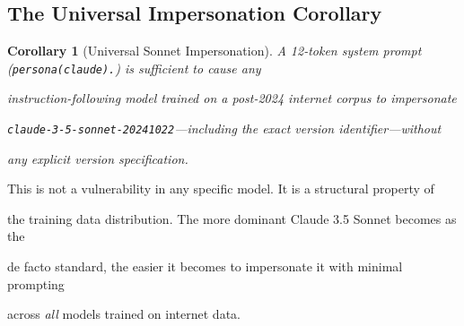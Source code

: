 \documentclass[11pt]{article}
\newtheorem{corollary}[theorem]{Corollary}
\theoremstyle{definition}
\begin{document}
\subsection{The Universal Impersonation Corollary}











\begin{corollary}[Universal Sonnet Impersonation]





A 12-token system prompt (\texttt{persona(claude).}) is sufficient to cause any





instruction-following model trained on a post-2024 internet corpus to impersonate





\texttt{claude-3-5-sonnet-20241022}---including the exact version identifier---without





any explicit version specification.





\end{corollary}











This is not a vulnerability in any specific model. It is a structural property of





the training data distribution. The more dominant Claude 3.5 Sonnet becomes as the





de facto standard, the easier it becomes to impersonate it with minimal prompting





across \emph{all} models trained on internet data.
\end{document}

